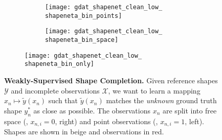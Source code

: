 \begin{figure}
\begin{subfigure}[t]{0.29\textwidth}
\begin{subfigure}[t]{0.49\textwidth}
            \centering\vspace{0px}
            \texttt{[image: gdat\_shapenet\_clean\_low\_\\shapeneta\_bin\_points]}
        \end{subfigure}
        \begin{subfigure}[t]{0.49\textwidth}
            \centering\vspace{0px}
            \texttt{[image: gdat\_shapenet\_clean\_low\_\\shapeneta\_bin\_space]}
        \end{subfigure}
    \end{subfigure}
    \hfill
    \begin{subfigure}[t]{0.18\textwidth}
        \centering\vspace{0px}
        \texttt{[image: gdat\_shapenet\_clean\_low\_\\shapeneta\_bin\_only]}
    \end{subfigure}
    \vspace*{-\figskipcaption px}
    \caption{{\bf Weakly-Supervised Shape Completion.} Given reference shapes $\mathcal{Y}$ and incomplete observations $\mathcal{X}$, we want to learn a mapping $x_n \mapsto \tilde{y}(x_n)$ such that $\tilde{y}(x_n)$ matches the \emph{unknown} ground truth shape $y_n^*$ as close as possible. The observations $x_n$ are split into free space (\ie, $x_{n,i} = 0$, right) and point observations (\ie, $x_{n,i} = 1$, left). Shapes are shown in {\color{rbeige}beige} and observations in {\color{rred}red}.}
    \label{fig:method-problem}
    \vspace*{-\figskipbelow px}
\end{figure}